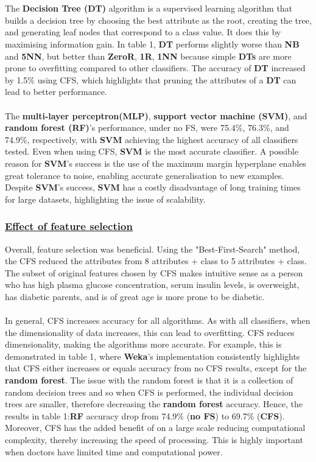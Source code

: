 \documentclass{article}
\begin{document}
    \\
    \\
    The \textbf{Decision Tree (DT)} algorithm is a supervised learning algorithm that builds a decision tree by choosing the best attribute as the root, creating the tree, and generating leaf nodes that correspond to a class value. It does this by maximising information gain. In table 1, \textbf{DT} performs slightly worse than \textbf{NB} and \textbf{5NN}, but better than \textbf{ZeroR}, \textbf{1R}, \textbf{1NN} because simple \textbf{DTs} are more prone to overfitting compared to other classifiers. The accuracy of \textbf{DT} increased by 1.5\% using CFS, which highlights that pruning the attributes of a \textbf{DT} can lead to better performance.
    \\
    \\
    The \textbf{multi-layer perceptron(MLP)}, \textbf{support vector machine (SVM)}, and \textbf{random forest (RF)}'s performance, under no FS, were 75.4\%, 76.3\%, and 74.9\%, respectively, with \textbf{SVM} achieving the highest accuracy of all classifiers tested. Even when using CFS, \textbf{SVM} is the most accurate classifier. A possible reason for \textbf{SVM}'s success is the use of the maximum margin hyperplane enables great tolerance to noise, enabling accurate generalisation to new examples. Despite \textbf{SVM}'s success,  \textbf{SVM} has a costly disadvantage of long training times for large datasets, highlighting the issue of scalability.
    
    \subsubsection*{\underline{Effect of feature selection}}
    Overall, feature selection was beneficial. Using the "Best-First-Search" method, the CFS reduced the attributes from 8 attributes + class to 5 attributes + class. The subset of original features chosen by CFS makes intuitive sense as a person who has high plasma glucose concentration, serum insulin levels, is overweight, has diabetic parents, and is of great age is more prone to be diabetic.
    \\
    \\
    In general, CFS increases accuracy for all algorithms. As with all classifiers, when the dimensionality of data increases, this can lead to overfitting. CFS reduces dimensionality, making the algorithms more accurate. For example, this is demonstrated in table 1, where \textbf{Weka}'s implementation consistently highlights that CFS either increases or equals accuracy from no CFS results, except for the \textbf{random forest}. The issue with the random forest is that it is a collection of random decision trees and so when CFS is performed, the individual decision trees are smaller, therefore decreasing the \textbf{random forest} accuracy. Hence, the results in table 1:\textbf{RF} accuracy drop from 74.9\% (\textbf{no FS}) to 69.7\% (\textbf{CFS}). Moreover, CFS has the added benefit of on a large scale reducing computational complexity, thereby increasing the speed of processing. This is highly important when doctors have limited time and computational power.
\end{document}
